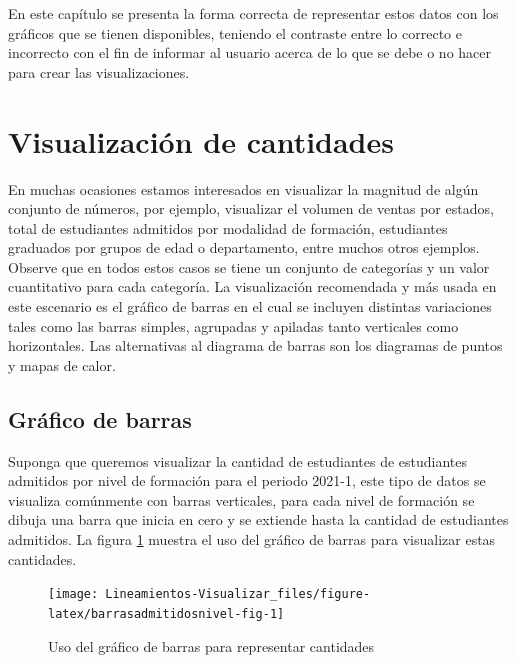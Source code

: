 \documentclass[
]{book}
\begin{document}
En este capítulo se presenta la forma correcta de representar estos datos con los gráficos que se tienen disponibles, teniendo el contraste entre lo correcto e incorrecto con el fin de informar al usuario acerca de lo que se debe o no hacer para crear las visualizaciones.

\hypertarget{visualizaciuxf3n-de-cantidades}{%
\section{Visualización de cantidades}\label{visualizaciuxf3n-de-cantidades}}

En muchas ocasiones estamos interesados en visualizar la magnitud de algún conjunto de números, por ejemplo, visualizar el volumen de ventas por estados, total de estudiantes admitidos por modalidad de formación, estudiantes graduados por grupos de edad o departamento, entre muchos otros ejemplos. Observe que en todos estos casos se tiene un conjunto de categorías y un valor cuantitativo para cada categoría. La visualización recomendada y más usada en este escenario es el gráfico de barras en el cual se incluyen distintas variaciones tales como las barras simples, agrupadas y apiladas tanto verticales como horizontales. Las alternativas al diagrama de barras son los diagramas de puntos y mapas de calor.

\hypertarget{gruxe1fico-de-barras}{%
\subsection{Gráfico de barras}\label{gruxe1fico-de-barras}}

Suponga que queremos visualizar la cantidad de estudiantes de estudiantes admitidos por nivel de formación para el periodo 2021-1, este tipo de datos se visualiza comúnmente con barras verticales, para cada nivel de formación se dibuja una barra que inicia en cero y se extiende hasta la cantidad de estudiantes admitidos. La figura \ref{fig:barrasadmitidosnivel-fig} muestra el uso del gráfico de barras para visualizar estas cantidades.

\begin{figure}

{\centering \texttt{[image: Lineamientos-Visualizar\_files/figure-latex/barrasadmitidosnivel-fig-1]} 

}

\caption{Uso del gráfico de barras para representar cantidades}\label{fig:barrasadmitidosnivel-fig}
\end{figure}
\end{document}
